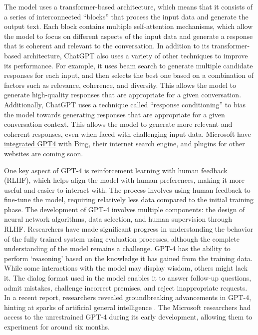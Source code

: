 The model uses a transformer-based architecture, which means that it consists of a series of interconnected ``blocks'' that process the input data and generate the output text. Each block contains multiple self-attention mechanisms, which allow the model to focus on different aspects of the input data and generate a response that is coherent and relevant to the conversation. In addition to its transformer-based architecture, ChatGPT also uses a variety of other techniques to improve its performance. For example, it uses beam search to generate multiple candidate responses for each input, and then selects the best one based on a combination of factors such as relevance, coherence, and diversity. This allows the model to generate high-quality responses that are appropriate for a given conversation. Additionally, ChatGPT uses a technique called ``response conditioning'' to bias the model towards generating responses that are appropriate for a given conversation context. This allows the model to generate more relevant and coherent responses, even when faced with challenging input data. Microsoft have  \href{https://medium.com/@owenyin/scoop-oh-the-things-youll-do-with-bing-s-chatgpt-62b42d8d7198}{integrated GPT4} with Bing, their internet search engine, and plugins for other websites are coming soon.\par 
One key aspect of GPT-4 is reinforcement learning with human feedback (RLHF), which helps align the model with human preferences, making it more useful and easier to interact with. The process involves using human feedback to fine-tune the model, requiring relatively less data compared to the initial training phase. The development of GPT-4 involves multiple components: the design of neural network algorithms, data selection, and human supervision through RLHF. Researchers have made significant progress in understanding the behavior of the fully trained system using evaluation processes, although the complete understanding of the model remains a challenge. GPT-4 has the ability to perform `reasoning' based on the knowledge it has gained from the training data. While some interactions with the model may display wisdom, others might lack it. The dialog format used in the model enables it to answer follow-up questions, admit mistakes, challenge incorrect premises, and reject inappropriate requests. In a recent report, researchers revealed groundbreaking advancements in GPT-4, hinting at sparks of artificial general intelligence \cite{bubeck2023sparks}. The Microsoft researchers had access to the unrestrained GPT-4 during its early development, allowing them to experiment for around six months. 
